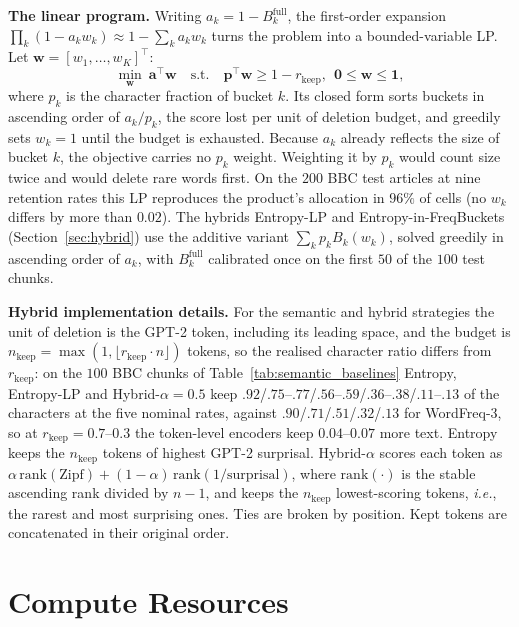 \documentclass[11pt]{article}
\newcommand{\rkeep}{r_{\mathrm{keep}}}
\begin{document}
\textbf{The linear program.}
Writing $a_k = 1 - B_k^{\mathrm{full}}$, the first-order expansion
$\prod_k (1 - a_k w_k) \approx 1 - \sum_k a_k w_k$ turns the
problem into a bounded-variable LP.  Let
$\mathbf{w} = [w_1, \ldots, w_K]^\top$:
\begin{equation*}
  \min_{\mathbf{w}} \ \mathbf{a}^\top \mathbf{w}
  \quad \text{s.t.} \quad \mathbf{p}^\top \mathbf{w} \ge 1 - \rkeep,\ \ \mathbf{0} \le \mathbf{w} \le \mathbf{1},
\end{equation*}
where $p_k$ is the character fraction of bucket $k$.  Its
closed form sorts buckets in ascending order of $a_k / p_k$,
the score lost per unit of deletion budget, and greedily sets
$w_k = 1$ until the budget is exhausted.  Because $a_k$ already
reflects the size of bucket $k$, the objective carries no $p_k$ weight. Weighting it by $p_k$ would count size twice and
would delete rare words first.  On the $200$ BBC test articles
at nine retention rates this LP reproduces the product's
allocation in $96\%$ of cells (no $w_k$ differs by more than
$0.02$).  The hybrids Entropy-LP and Entropy-in-FreqBuckets
(Section~\ref{sec:hybrid}) use the additive variant
$\sum_k p_k B_k(w_k)$, solved greedily in ascending order of
$a_k$, with $B_k^{\mathrm{full}}$ calibrated once on the first $50$ of the $100$ test chunks.

\textbf{Hybrid implementation details.}
For the semantic and hybrid strategies the unit of deletion is the GPT-2 token, including its leading
space, and the budget is $n_{\mathrm{keep}} = \max(1, \lfloor \rkeep \cdot n \rfloor)$ tokens, so the realised
character ratio differs from $\rkeep$: on the $100$ BBC chunks of Table~\ref{tab:semantic_baselines} Entropy,
Entropy-LP and Hybrid-$\alpha{=}0.5$ keep $.92$/$.75$--$.77$/$.56$--$.59$/$.36$--$.38$/$.11$--$.13$ of the
characters at the five nominal rates, against $.90$/$.71$/$.51$/$.32$/$.13$ for WordFreq-3, so at
$\rkeep = 0.7$--$0.3$ the token-level encoders keep $0.04$--$0.07$ more text. Entropy keeps the $n_{\mathrm{keep}}$ tokens of highest
GPT-2 surprisal. Hybrid-$\alpha$ scores each token as
$\alpha\,\mathrm{rank}(\text{Zipf}) + (1-\alpha)\,\mathrm{rank}(1/\text{surprisal})$, where
$\mathrm{rank}(\cdot)$ is the stable ascending rank divided by $n-1$, and keeps the $n_{\mathrm{keep}}$
lowest-scoring tokens, {\em i.e.}, the rarest and most surprising ones. Ties are broken by position. Kept tokens
are concatenated in their original order.

\section{Compute Resources}
\label{app:compute}
\end{document}
